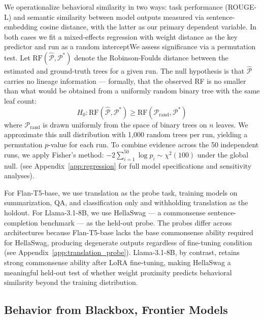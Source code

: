 \documentclass{article}
\begin{document}
We operationalize behavioral similarity in two ways: task performance
(ROUGE-L) and semantic similarity between model outputs measured via
sentence-embedding cosine distance, with the latter as our primary
dependent variable. In both cases we fit a mixed-effects regression with
weight distance as the key predictor and run as a random interceptWe assess significance via a permutation test. Let $\mathrm{RF}(\widehat{\mathcal{P}},
\mathcal{P}^*)$ denote the Robinson-Foulds distance between the estimated and
ground-truth trees for a given run. The null hypothesis is that $\widehat{\mathcal{P}}$
carries no lineage information --- formally, that the observed RF is no smaller than
what would be obtained from a uniformly random binary tree with the same leaf count:
$$
H_0: \mathrm{RF}(\widehat{\mathcal{P}}, \mathcal{P}^*) \ge
     \mathrm{RF}(\mathcal{P}_{\text{rand}}, \mathcal{P}^*)
$$
where $\mathcal{P}_{\text{rand}}$ is drawn uniformly from the space of binary trees
on $n$ leaves. We approximate this null distribution with 1{,}000 random trees per
run, yielding a permutation $p$-value for each run. To combine evidence across the
50 independent runs, we apply Fisher's method: $-2\sum_{i=1}^{50} \log p_i \sim
\chi^2(100)$ under the global null.
(see Appendix~\ref{app:regression} for full model specifications and
sensitivity analyses).

For Flan-T5-base, we use translation as the probe task, training models
on summarization, QA, and classification only and withholding translation
as the holdout. For Llama-3.1-8B, we use HellaSwag --- a commonsense
sentence-completion benchmark --- as the held-out probe. The probes differ
across architectures because Flan-T5-base lacks the base commonsense
ability required for HellaSwag, producing degenerate outputs regardless
of fine-tuning condition (see Appendix~\ref{app:translation_probe}).
Llama-3.1-8B, by contrast, retains strong commonsense ability after
LoRA fine-tuning, making HellaSwag a meaningful held-out test of whether
weight proximity predicts behavioral similarity beyond the training
distribution.

\subsection{Behavior from Blackbox, Frontier Models}
\label{sec:exp:blackbox}
\end{document}

